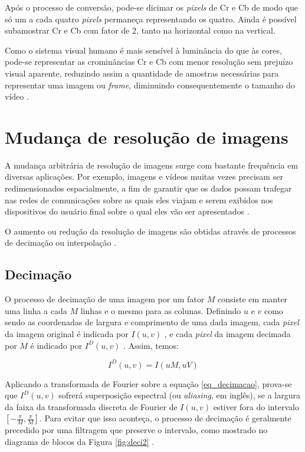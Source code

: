 \noindent Após o processo de conversão, pode-se dicimar os \textit{pixels} de Cr e Cb de modo que só um a cada quatro \textit{pixels} permaneça representando os quatro. Ainda é possível subamostrar Cr e Cb com fator de 2, tanto na horizontal como na vertical.

Como o sistema visual humano é mais sensível à luminância do que às cores, pode-se representar as crominâncias Cr e Cb com menor resolução sem prejuízo visual aparente, reduzindo assim a quantidade de amostras necessárias para representar uma imagem ou \textit{frame}, diminuindo consequentemente o tamanho do vídeo \cite{itu16601}.

\section{Mudança de resolução de imagens}

A mudança arbitrária de resolução de imagens surge com bastante frequência em diversas aplicações. Por exemplo, imagens e vídeos muitas vezes precisam ser redimensionados espacialmente, a fim de garantir que os dados possam trafegar nas redes de comunicações sobre as quais eles viajam e serem exibidos nos dispositivos do usuário final sobre o qual eles vão ser apresentados \cite{salazar2007complexity}.

O aumento ou redução da resolução de imagens são obtidas através de processos de decimação ou interpolação \cite{diniz2010digital}. 

\subsection{Decimação}

O processo de decimação de uma imagem por um fator $M$ consiste em manter uma linha a cada $M$ linhas e o mesmo para as colunas. Definindo $u$ e $v$ como sendo as coordenadas de largura e comprimento de uma dada imagem, cada \textit{pixel} da imagem original é indicada por $I(u,v)$ , e cada \textit{pixel} da imagem decimada por $M$ é indicado por $I^D(u,v)$  \cite{garcia2013tecnicas}. Assim, temos:

\begin{equation}
I^D(u,v) = I(uM,uV) 
\label{eq_decimacao}
\end{equation}

Aplicando a transformada de Fourier sobre a equação \ref{eq_decimacao}, prova-se que $I^D(u,v)$ sofrerá superposição espectral (ou \textit{aliasing}, em inglês), se a largura da faixa da transformada discreta de Fourier  de $I(u,v)$ estiver fora do intervalo $\left[-\frac{\pi}{M},\frac{\pi}{M} \right]$. Para evitar que isso aconteça, o processo de decimação é geralmente precedido por uma filtragem que preserve o intervalo, como mostrado no diagrama de blocos da Figura \ref{fig:deci2} \cite{garcia2013tecnicas} . 

